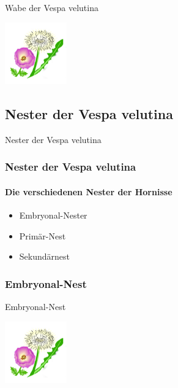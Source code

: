 \documentclass[aspectratio=169]{beamer}
\begin{document}
	\begin{frame}{Wabe der Vespa velutina}
		\begin{center}	
			\includegraphics[width=0.2\textwidth]{figures/BH-Logo_Quat.png}
		\end{center}

		\end{frame}


\subsection[Nester]{Nester der Vespa velutina}

\begin{frame}{Nester der Vespa velutina}
    \frametitle{Nester der Vespa velutina} 
    \framesubtitle{Die verschiedenen Nester der Hornisse}
    \begin{itemize} 
        \item 
            Embryonal-Nester \pause
        \item 
            Primär-Nest \pause
        \item 
            Sekundärnest 
    \end{itemize}
 
    \end{frame}

\subsubsection[Embryonal-Nest]{Embryonal-Nest}


	\begin{frame}{Embryonal-Nest}
		\begin{center}	
			\includegraphics[width=0.2\textwidth]{figures/BH-Logo_Quat.png}
		\end{center}

		\end{frame}
\end{document}
